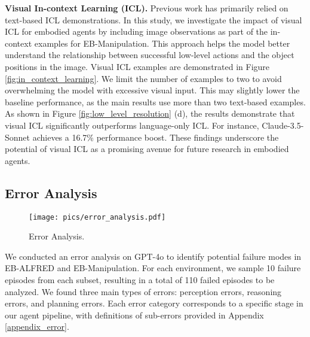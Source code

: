 \textbf{Visual In-context Learning (ICL). }Previous work has primarily relied on text-based ICL demonstrations. In this study, we investigate the impact of visual ICL for embodied agents by including image observations as part of the in-context examples for EB-Manipulation. This approach helps the model better understand the relationship between successful low-level actions and the object positions in the image. Visual ICL examples are demonstrated in Figure \ref{fig:in_context_learning}. We limit the number of examples to two to avoid overwhelming the model with excessive visual input. This may slightly lower the baseline performance, as the main results use more than two text-based examples. As shown in Figure \ref{fig:low_level_resolution} (d), the results demonstrate that visual ICL significantly outperforms language-only ICL. For instance, Claude-3.5-Sonnet achieves a 16.7\% performance boost. These findings underscore the potential of visual ICL as a promising avenue for future research in embodied agents.


\vspace{-5pt}
\subsection{Error Analysis}\label{sec:error_analysis}
\vspace{-5pt}
\begin{figure}[t]
\begin{center}
\vspace{-5pt}
\texttt{[image: pics/error\_analysis.pdf]}
\end{center}
\vspace{-1.5em}
\caption{Error Analysis.}
\vspace{-2em}
\label{fig:error_analysis}
\end{figure}



We conducted an error analysis on GPT-4o to identify potential failure modes in EB-ALFRED and EB-Manipulation. For each environment, we sample 10 failure episodes from each subset, resulting in a total of 110 failed episodes to be analyzed. We found three main types of errors: perception errors, reasoning errors, and planning errors. Each error category corresponds to a specific stage in our agent pipeline, with definitions of sub-errors provided in Appendix \ref{appendix_error}.


